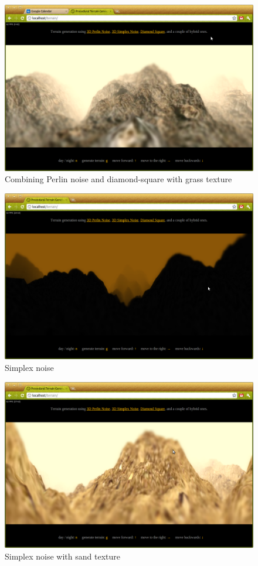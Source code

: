\begin{figure}
	\center
	\includegraphics[scale=0.4]{demo_2_1.png}
	\caption{Combining Perlin noise and diamond-square with grass texture}
	\label{fig:demo_2_1}
\end{figure}
\begin{figure}
	\center
	\includegraphics[scale=0.4]{demo_3_0.png}
	\caption{Simplex noise}
	\label{fig:demo_3_0}
\end{figure}
\begin{figure}
	\center
	\includegraphics[scale=0.4]{demo_3_2.png}
	\caption{Simplex noise with sand texture}
	\label{fig:demo_3_2}
\end{figure}
